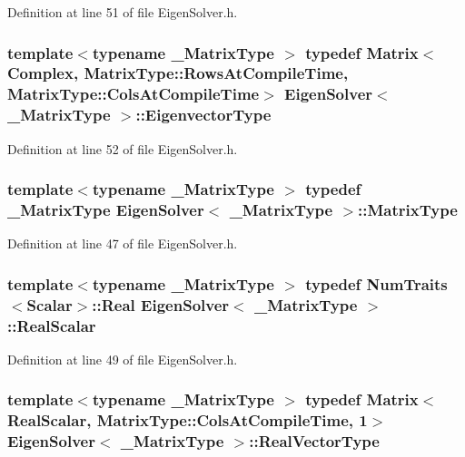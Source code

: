 Definition at line 51 of file Eigen\-Solver.\-h.

\hypertarget{class_eigen_solver_a573e33fff25ab71e92f5f3d50eb80338}{
\subsubsection[{Eigenvector\-Type}]{\setlength{\rightskip}{0pt plus 5cm}template$<$typename \-\_\-\-Matrix\-Type $>$ typedef {\bf Matrix}$<${\bf Complex}, Matrix\-Type\-::\-Rows\-At\-Compile\-Time, Matrix\-Type\-::\-Cols\-At\-Compile\-Time$>$ {\bf Eigen\-Solver}$<$ \-\_\-\-Matrix\-Type $>$\-::{\bf Eigenvector\-Type}}}\label{class_eigen_solver_a573e33fff25ab71e92f5f3d50eb80338}


Definition at line 52 of file Eigen\-Solver.\-h.

\hypertarget{class_eigen_solver_a2fd3a7b430468ffe4316cb8729c80bb2}{
\subsubsection[{Matrix\-Type}]{\setlength{\rightskip}{0pt plus 5cm}template$<$typename \-\_\-\-Matrix\-Type $>$ typedef \-\_\-\-Matrix\-Type {\bf Eigen\-Solver}$<$ \-\_\-\-Matrix\-Type $>$\-::{\bf Matrix\-Type}}}\label{class_eigen_solver_a2fd3a7b430468ffe4316cb8729c80bb2}


Definition at line 47 of file Eigen\-Solver.\-h.

\hypertarget{class_eigen_solver_a90899b9a9b6155f766160e9ffc75117b}{
\subsubsection[{Real\-Scalar}]{\setlength{\rightskip}{0pt plus 5cm}template$<$typename \-\_\-\-Matrix\-Type $>$ typedef {\bf Num\-Traits}$<${\bf Scalar}$>$\-::Real {\bf Eigen\-Solver}$<$ \-\_\-\-Matrix\-Type $>$\-::{\bf Real\-Scalar}}}\label{class_eigen_solver_a90899b9a9b6155f766160e9ffc75117b}


Definition at line 49 of file Eigen\-Solver.\-h.

\hypertarget{class_eigen_solver_af62a93e73fdeb86320f622b727126eed}{
\subsubsection[{Real\-Vector\-Type}]{\setlength{\rightskip}{0pt plus 5cm}template$<$typename \-\_\-\-Matrix\-Type $>$ typedef {\bf Matrix}$<${\bf Real\-Scalar}, Matrix\-Type\-::\-Cols\-At\-Compile\-Time, 1$>$ {\bf Eigen\-Solver}$<$ \-\_\-\-Matrix\-Type $>$\-::{\bf Real\-Vector\-Type}}}\label{class_eigen_solver_af62a93e73fdeb86320f622b727126eed}


